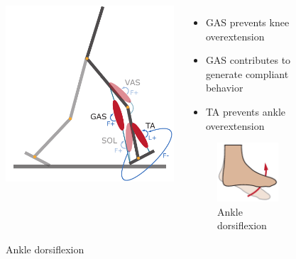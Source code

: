 \documentclass[10pt]{beamer}
\begin{document}
\begin{frame}
\begin{figure}
\begin{overprint}
				\begin{columns}
					\begin{column}{.5\textwidth}
						\includegraphics[height=.5\textheight]{images/new_model/stance/muscle_vas_sol_gas_ta.pdf} 
						\caption{New bipedal locomotion model with muscles}
					\end{column}
					\begin{column}{.5\textwidth}
						\begin{exampleblock}{}
							\begin{itemize}
								\item GAS prevents knee overextension  \\[.4em]
								\item GAS contributes to generate compliant behavior \\[.4em]
								\item TA prevents ankle overextension
							\end{itemize}
						\end{exampleblock}
					\begin{figure}
							\centering
							\includegraphics[height=.25\textheight]{images/ankle_dorsiflexion.pdf}
							\caption{Ankle dorsiflexion}
						\end{figure}
					\end{column}
				\end{columns}
				

\end{overprint}
\end{figure}
\end{frame}
\end{document}
